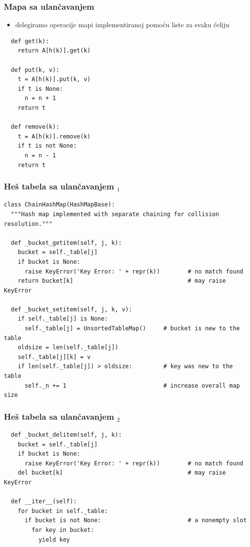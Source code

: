 \documentclass[compress,aspectratio=169]{beamer}
\begin{document}
\begin{frame}
  \frametitle{Mapa sa ulančavanjem}
  \begin{itemize}
    \item delegiramo operacije mapi implementiranoj pomoću liste za svaku ćeliju
  \end{itemize}
\begin{verbatim}
  def get(k):
    return A[h(k)].get(k)
  
  def put(k, v):
    t = A[h(k)].put(k, v)
    if t is None:
      n = n + 1
    return t
    
  def remove(k):
    t = A[h(k)].remove(k)
    if t is not None:
      n = n - 1
    return t
\end{verbatim}
\end{frame}

\begin{frame}[fragile,shrink=25]
  \frametitle{Heš tabela sa ulančavanjem $_1$}
\begin{verbatim}
class ChainHashMap(HashMapBase):
  """Hash map implemented with separate chaining for collision resolution."""

  def _bucket_getitem(self, j, k):
    bucket = self._table[j]
    if bucket is None:
      raise KeyError('Key Error: ' + repr(k))        # no match found
    return bucket[k]                                 # may raise KeyError

  def _bucket_setitem(self, j, k, v):
    if self._table[j] is None:
      self._table[j] = UnsortedTableMap()     # bucket is new to the table
    oldsize = len(self._table[j])
    self._table[j][k] = v
    if len(self._table[j]) > oldsize:         # key was new to the table
      self._n += 1                            # increase overall map size
\end{verbatim}
\end{frame}

\begin{frame}[fragile,shrink=25]
  \frametitle{Heš tabela sa ulančavanjem $_2$}
\begin{verbatim}
  def _bucket_delitem(self, j, k):
    bucket = self._table[j]
    if bucket is None:
      raise KeyError('Key Error: ' + repr(k))        # no match found
    del bucket[k]                                    # may raise KeyError

  def __iter__(self):
    for bucket in self._table:
      if bucket is not None:                         # a nonempty slot
        for key in bucket:
          yield key
\end{verbatim}
\end{frame}
\end{document}
